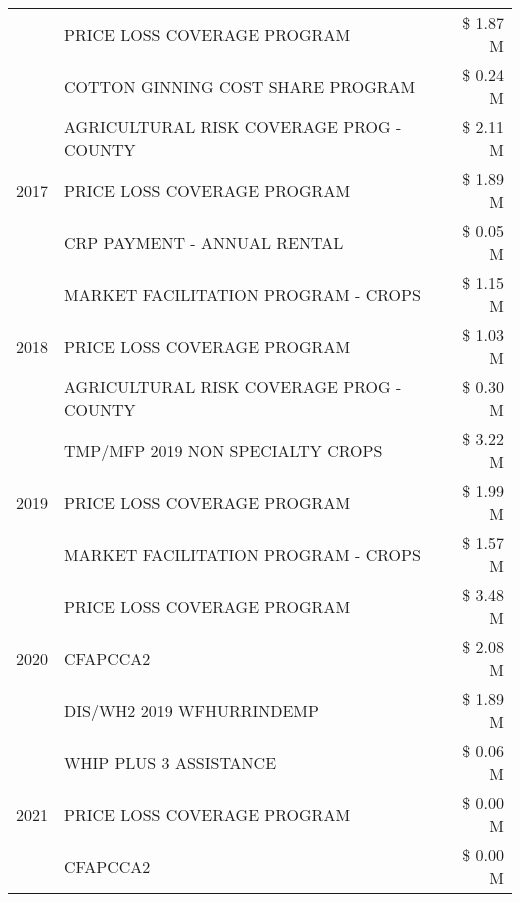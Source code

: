 \begin{tabular}{llr}
 & PRICE LOSS COVERAGE PROGRAM & \$ 1.87 M \\
 & COTTON GINNING COST SHARE PROGRAM & \$ 0.24 M \\
\cline{1-3}
\multirow[t]{3}{*}{2017} & AGRICULTURAL RISK COVERAGE PROG - COUNTY & \$ 2.11 M \\
 & PRICE LOSS COVERAGE PROGRAM & \$ 1.89 M \\
 & CRP PAYMENT - ANNUAL RENTAL & \$ 0.05 M \\
\cline{1-3}
\multirow[t]{3}{*}{2018} & MARKET FACILITATION PROGRAM - CROPS & \$ 1.15 M \\
 & PRICE LOSS COVERAGE PROGRAM & \$ 1.03 M \\
 & AGRICULTURAL RISK COVERAGE PROG - COUNTY & \$ 0.30 M \\
\cline{1-3}
\multirow[t]{3}{*}{2019} & TMP/MFP 2019 NON SPECIALTY CROPS & \$ 3.22 M \\
 & PRICE LOSS COVERAGE PROGRAM & \$ 1.99 M \\
 & MARKET FACILITATION PROGRAM - CROPS & \$ 1.57 M \\
\cline{1-3}
\multirow[t]{3}{*}{2020} & PRICE LOSS COVERAGE PROGRAM & \$ 3.48 M \\
 & CFAPCCA2 & \$ 2.08 M \\
 & DIS/WH2 2019 WFHURRINDEMP & \$ 1.89 M \\
\cline{1-3}
\multirow[t]{3}{*}{2021} & WHIP PLUS 3 ASSISTANCE & \$ 0.06 M \\
 & PRICE LOSS COVERAGE PROGRAM & \$ 0.00 M \\
 & CFAPCCA2 & \$ 0.00 M \\
\cline{1-3}
\bottomrule
\end{tabular}
